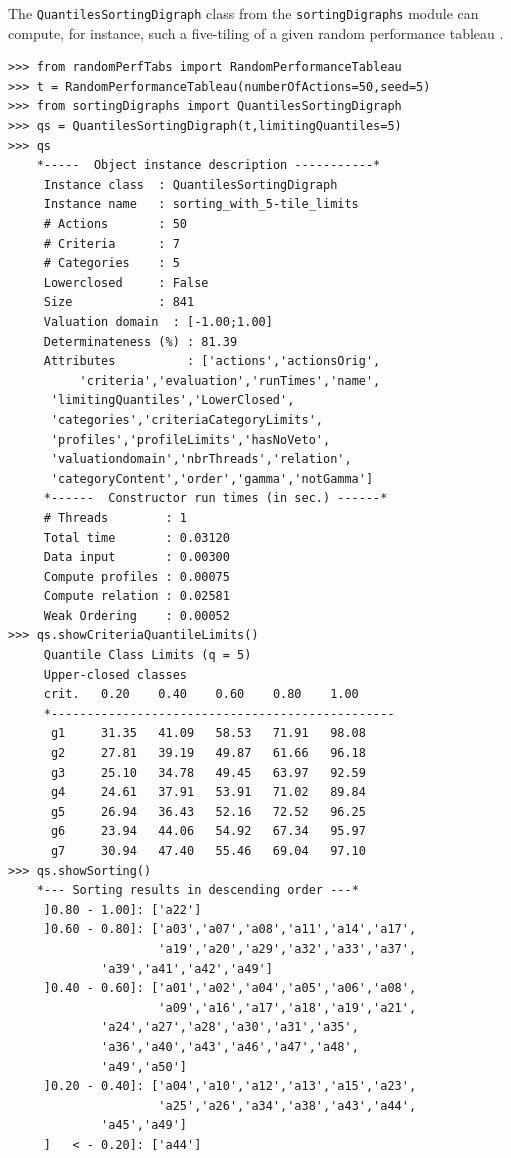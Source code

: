 The \texttt{QuantilesSortingDigraph} class  from the \texttt{sortingDigraphs} module can compute, for instance, such a five-tiling of a given random performance tableau \citep{BIS-2021b}.
\begin{lstlisting}[caption={Computing a quintiles sorting result},label=list:9.1]
>>> from randomPerfTabs import RandomPerformanceTableau
>>> t = RandomPerformanceTableau(numberOfActions=50,seed=5)
>>> from sortingDigraphs import QuantilesSortingDigraph
>>> qs = QuantilesSortingDigraph(t,limitingQuantiles=5)
>>> qs
    *-----  Object instance description -----------*
     Instance class  : QuantilesSortingDigraph
     Instance name   : sorting_with_5-tile_limits
     # Actions       : 50
     # Criteria      : 7
     # Categories    : 5
     Lowerclosed     : False
     Size            : 841
     Valuation domain  : [-1.00;1.00]
     Determinateness (%) : 81.39
     Attributes          : ['actions','actionsOrig',
          'criteria','evaluation','runTimes','name',
	  'limitingQuantiles','LowerClosed',
	  'categories','criteriaCategoryLimits',
	  'profiles','profileLimits','hasNoVeto',
	  'valuationdomain','nbrThreads','relation',
	  'categoryContent','order','gamma','notGamma']
     *------  Constructor run times (in sec.) ------*
     # Threads        : 1
     Total time       : 0.03120
     Data input       : 0.00300
     Compute profiles : 0.00075
     Compute relation : 0.02581
     Weak Ordering    : 0.00052
>>> qs.showCriteriaQuantileLimits()
     Quantile Class Limits (q = 5)
     Upper-closed classes
     crit.	 0.20	 0.40	 0.60	 0.80	 1.00	 
     *------------------------------------------------
      g1	 31.35	 41.09	 58.53	 71.91	 98.08	 
      g2	 27.81	 39.19	 49.87	 61.66	 96.18	 
      g3	 25.10	 34.78	 49.45	 63.97	 92.59	 
      g4	 24.61	 37.91	 53.91	 71.02	 89.84	 
      g5	 26.94	 36.43	 52.16	 72.52	 96.25	 
      g6	 23.94	 44.06	 54.92	 67.34	 95.97	 
      g7	 30.94	 47.40	 55.46	 69.04	 97.10	 
>>> qs.showSorting()
    *--- Sorting results in descending order ---*
     ]0.80 - 1.00]: ['a22']
     ]0.60 - 0.80]: ['a03','a07','a08','a11','a14','a17',
                     'a19','a20','a29','a32','a33','a37',
		     'a39','a41','a42','a49']
     ]0.40 - 0.60]: ['a01','a02','a04','a05','a06','a08',
                     'a09','a16','a17','a18','a19','a21',
		     'a24','a27','a28','a30','a31','a35',
		     'a36','a40','a43','a46','a47','a48',
		     'a49','a50']
     ]0.20 - 0.40]: ['a04','a10','a12','a13','a15','a23',
                     'a25','a26','a34','a38','a43','a44',
		     'a45','a49']
     ]   < - 0.20]: ['a44']
   \end{lstlisting}

